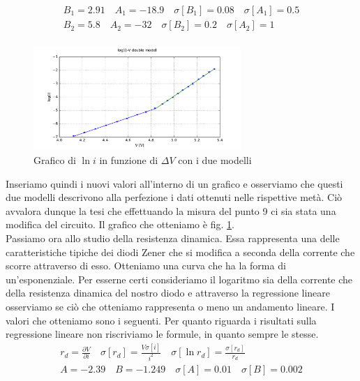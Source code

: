 \begin{gather}
    B_1 = 2.91 \quad A_1 = -18.9 \quad \sigma[B_1] = 0.08 \quad \sigma[A_1] = 0.5
    \\
    B_2 = 5.8 \quad A_2 = -32 \quad \sigma[B_2] = 0.2 \quad \sigma[A_2] = 1
    \\
    \label{eq:regr2}
\end{gather}

\begin{figure} [h]
    \centering
    \includegraphics[width=0.7\textwidth]{fig3Z.pdf} 
    \caption{Grafico di $\ln{i}$ in funzione di $\Delta V$ con i due modelli}
    \label{fig:gZc}
\end{figure}

Inseriamo quindi i nuovi valori all'interno di un grafico e osserviamo che questi due modelli descrivono alla perfezione i dati ottenuti nelle rispettive metà. Ciò avvalora dunque la tesi che effettuando la misura del punto 9 ci sia stata una modifica del circuito. Il grafico che otteniamo è fig. \ref{fig:gZc}. \\ 


Passiamo ora allo studio della resistenza dinamica. Essa rappresenta una delle caratteristiche tipiche dei diodi Zener che si modifica a seconda della corrente che scorre attraverso di esso. Otteniamo una curva che ha la forma di un'esponenziale. Per esserne certi consideriamo il logaritmo sia della corrente che della resistenza dinamica del nostro diodo e attraverso la regressione lineare osserviamo se ciò che otteniamo rappresenta o meno un andamento lineare. I valori che otteniamo sono i seguenti. Per quanto riguarda i risultati sulla regressione lineare non riscriviamo le formule, in quanto sempre le stesse. \\

\begin{gather}
    r_d = \frac{\partial V}{\partial i} \quad \sigma[r_d] = \frac{V \sigma[i]}{i^2} \quad \sigma[\ln{r_d}] = \frac{\sigma[r_d]}{r_d}
    \\
    A = -2.39 \quad B = -1.249 \quad \sigma[A] = 0.01 \quad \sigma[B] = 0.002
    \\
    \label{eq:regr3}
\end{gather}

